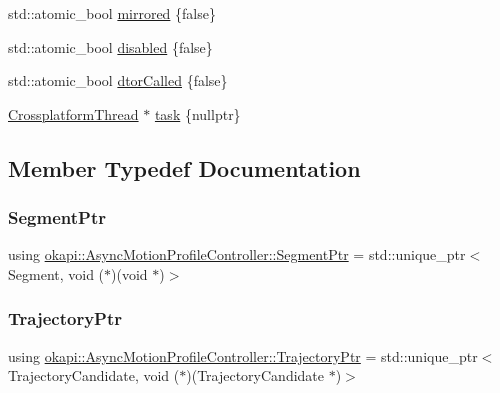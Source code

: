 \begin{DoxyCompactItemize}
\item 
std\+::atomic\+\_\+bool \mbox{\hyperlink{classokapi_1_1AsyncMotionProfileController_ac3eb4334e86030a0717ad424062abaab}{mirrored}} \{false\}
\item 
std\+::atomic\+\_\+bool \mbox{\hyperlink{classokapi_1_1AsyncMotionProfileController_a924ddedefab00c4e724dec77de37796f}{disabled}} \{false\}
\item 
std\+::atomic\+\_\+bool \mbox{\hyperlink{classokapi_1_1AsyncMotionProfileController_abd24ffe9b90ec6f85f1105d8f2bbf601}{dtor\+Called}} \{false\}
\item 
\mbox{\hyperlink{classCrossplatformThread}{Crossplatform\+Thread}} $\ast$ \mbox{\hyperlink{classokapi_1_1AsyncMotionProfileController_a9d62c3c449f8cb5db7a20d0d5dc87431}{task}} \{nullptr\}
\end{DoxyCompactItemize}


\subsection{Member Typedef Documentation}
\mbox{\label{classokapi_1_1AsyncMotionProfileController_a3ed298e703263af478d65e862afca6f3}} 
\subsubsection{\texorpdfstring{SegmentPtr}{SegmentPtr}}
{\footnotesize\ttfamily using \mbox{\hyperlink{classokapi_1_1AsyncMotionProfileController_a3ed298e703263af478d65e862afca6f3}{okapi\+::\+Async\+Motion\+Profile\+Controller\+::\+Segment\+Ptr}} =  std\+::unique\+\_\+ptr$<$Segment, void ($\ast$)(void $\ast$)$>$\hspace{0.3cm}{\ttfamily [protected]}}

\mbox{\label{classokapi_1_1AsyncMotionProfileController_acf9be87bd2dd90aec23d91f0474f2d35}} 
\subsubsection{\texorpdfstring{TrajectoryPtr}{TrajectoryPtr}}
{\footnotesize\ttfamily using \mbox{\hyperlink{classokapi_1_1AsyncMotionProfileController_acf9be87bd2dd90aec23d91f0474f2d35}{okapi\+::\+Async\+Motion\+Profile\+Controller\+::\+Trajectory\+Ptr}} =  std\+::unique\+\_\+ptr$<$Trajectory\+Candidate, void ($\ast$)(Trajectory\+Candidate $\ast$)$>$\hspace{0.3cm}{\ttfamily [protected]}}



